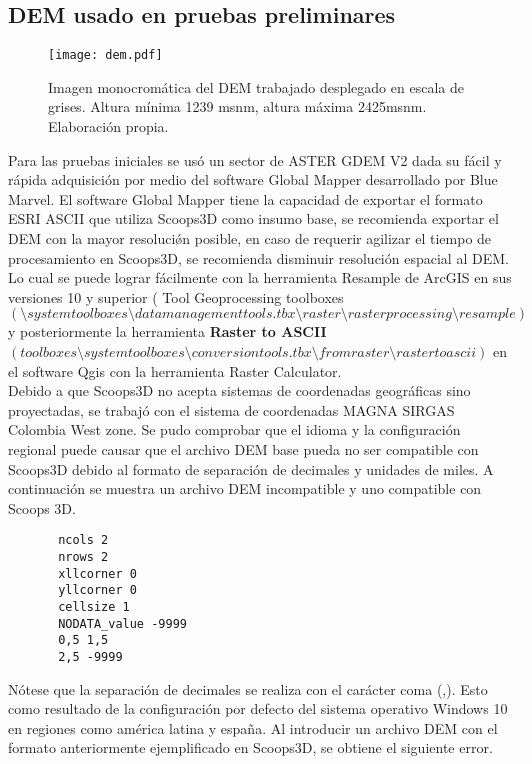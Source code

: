 \subsection{DEM usado en pruebas preliminares}
\label{demusado}


\begin{figure}[H]
\centering
\texttt{[image: dem.pdf]}
\caption{Imagen monocrom\'atica del DEM trabajado desplegado en escala de grises. Altura m\'inima 1239 msnm, altura m\'axima 2425msnm. Elaboraci\'on propia.}
\label{fig:dem usado}
\end{figure}


Para las pruebas iniciales se us\'o un sector de ASTER
GDEM V2 dada su f\'acil y r\'{a}pida adquisici\'on por medio del software Global Mapper
desarrollado por Blue Marvel.
El software Global Mapper tiene la capacidad de exportar el formato ESRI ASCII que utiliza
Scoops3D como insumo base, se recomienda exportar el DEM con la mayor resoluci\'{\o}n
posible, en caso de requerir agilizar el tiempo de procesamiento en Scoops3D, se
recomienda disminuir resoluci\'on espacial al DEM. Lo cual se puede lograr f\'{a}cilmente con la
herramienta Resample de ArcGIS en sus versiones 10 y superior (
Tool Geoprocessing
toolboxes $ (\setminus system toolboxes \setminus data management tools.tbx \setminus raster \setminus raster processing \setminus resample)$ y posteriormente la
herramienta \textbf{Raster to ASCII} $(toolboxes \setminus system toolboxes \setminus conversion tools.tbx \setminus from raster \setminus raster to ascii)$ en el software Qgis con la
herramienta Raster Calculator.\\
Debido a que Scoops3D no acepta sistemas de coordenadas geogr\'{a}ficas sino proyectadas,
se trabaj\'o con el sistema de coordenadas MAGNA SIRGAS Colombia West zone. 
Se pudo comprobar que el idioma y la configuraci\'on regional puede causar que el archivo
DEM base pueda no ser compatible con Scoops3D debido al formato de separaci\'on de
decimales y unidades de miles. A continuaci\'on se muestra un archivo DEM incompatible y
uno compatible con Scoops 3D.

\begin{verbatim}
	   ncols 2
	   nrows 2
	   xllcorner 0
	   yllcorner 0
	   cellsize 1
	   NODATA_value -9999
	   0,5 1,5
	   2,5 -9999
\end{verbatim}

N\'{o}tese que la separaci\'on de decimales se realiza con el car\'{a}cter coma (,). Esto como
resultado de la configuraci\'on por defecto del sistema operativo Windows 10 en regiones
como am\'{e}rica latina y espa\~na.
Al introducir un archivo DEM con el formato anteriormente ejemplificado en Scoops3D, se
obtiene el siguiente error.


